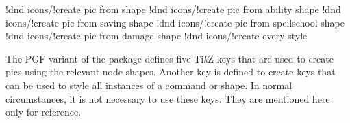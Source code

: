 \documentclass[a4paper]{article}
\begin{document}
\begin{macrodef}
!dnd icons/!create pic from shape
!dnd icons/!create pic from ability shape
!dnd icons/!create pic from saving shape 
!dnd icons/!create pic from spellschool shape
!dnd icons/!create pic from damage shape
!dnd icons/!create every style
\end{macrodef}
The PGF variant of the package defines five Ti\emph{k}Z keys that are used to create pics using the relevant node shapes. Another key is defined to create keys that can be used to style all instances of a command or shape. In normal circumstances, it is not necessary to use these keys. They are mentioned here only for reference. 


\printchanges
\end{document}
